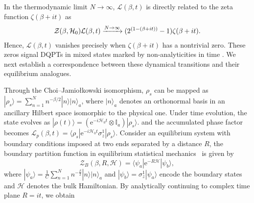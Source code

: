 \documentclass[aps,pra,twocolumn,superscriptaddress,preprintnumbers,amsmath,amssymb]{revtex4-2}
\begin{document}
In the thermodynamic limit $N \to \infty$, 
$\mathcal{L}(\beta,t)$ is directly related to the zeta function $\zeta(\beta + i t)$ as
\begin{eqnarray}\label{eq:relation1}
    {\cal Z}(\beta,\mathcal{H}_0){\cal L}(\beta,t)\xrightarrow{N\rightarrow\infty}(2^{(1-(\beta+it))}-1)\zeta(\beta+it).
\end{eqnarray}
  Hence, $\mathcal{L}(\beta,t)$ vanishes precisely when $\zeta(\beta + i t)$ has a nontrivial zero. These zeros signal DQPTs in mixed states marked by non-analyticities in time \cite{heyl2017dynamical}. %
  We next establish a correspondence between these dynamical transitions and their equilibrium analogues.
 


Through the Choi–Jamiołkowski isomorphism, $\rho_s$ can be mapped as
$|\rho_s\rangle=\sum_{n=1}^{N} n^{-\beta/2}|n\rangle |n\rangle_a $, where $|n\rangle_a$ denotes an orthonormal basis in an ancillary Hilbert space  isomorphic to the physical one.
Under time evolution, the state evolves as $|\rho(t)\rangle = (\mathrm{e}^{-i \mathcal{H}_0t} \otimes \mathbb{I}_a) |\rho_s\rangle.$
and the accumulated phase factor becomes
$\mathcal{L}_p(\beta,t)=\langle\rho_s | \mathrm{e}^{-i \mathcal{H}_0t} \sigma^1_z|\rho_s\rangle$.
Consider an equilibrium system with boundary conditions imposed at two ends separated by a distance $R$,
the boundary partition function in equilibrium statistical mechanics~\cite{heyl2018dynamical, leclair1995boundary} is given by
\begin{equation}
   \mathcal{Z}_{B}(\beta,R,\mathcal{H}) =\langle \psi_a | \mathrm{e}^{-R \mathcal{H}} | \psi_b \rangle,
\end{equation}
where $|\psi_a\rangle=\tfrac{1}{C}\textstyle\sum\limits_{n=1}^{N} n^{-\tfrac{\beta}{2}}|n\rangle|n\rangle_a$ and $|\psi_b\rangle= \sigma^1_z|\psi_a\rangle$ encode the boundary states and $\mathcal{H}$ denotes the bulk Hamiltonian. 
By analytically continuing to complex time plane $R = it$, we obtain
\end{document}
